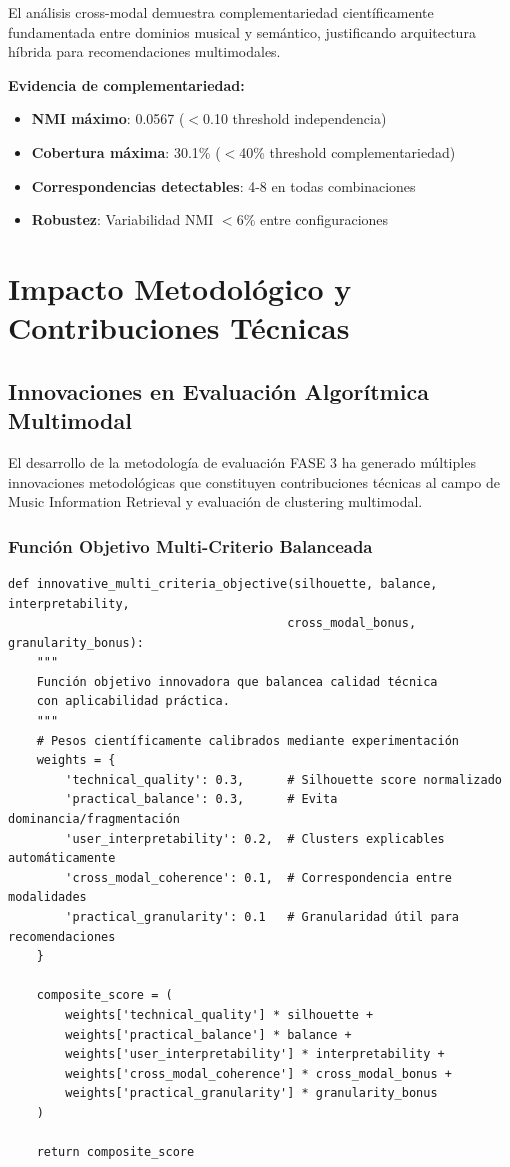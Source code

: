 \documentclass[12pt,a4paper]{report}
\begin{document}
El análisis cross-modal demuestra complementariedad científicamente fundamentada entre dominios musical y semántico, justificando arquitectura híbrida para recomendaciones multimodales.

\textbf{Evidencia de complementariedad:}
\begin{itemize}
    \item \textbf{NMI máximo}: 0.0567 ($<$0.10 threshold independencia)
    \item \textbf{Cobertura máxima}: 30.1\% ($<$40\% threshold complementariedad)
    \item \textbf{Correspondencias detectables}: 4-8 en todas combinaciones
    \item \textbf{Robustez}: Variabilidad NMI $<$6\% entre configuraciones
\end{itemize}

\section{Impacto Metodológico y Contribuciones Técnicas}

\subsection{Innovaciones en Evaluación Algorítmica Multimodal}

El desarrollo de la metodología de evaluación FASE 3 ha generado múltiples innovaciones metodológicas que constituyen contribuciones técnicas al campo de Music Information Retrieval y evaluación de clustering multimodal.

\subsubsection{Función Objetivo Multi-Criterio Balanceada}

\begin{lstlisting}[caption={Función Objetivo Innovadora Multi-Criterio}]
def innovative_multi_criteria_objective(silhouette, balance, interpretability,
                                       cross_modal_bonus, granularity_bonus):
    """
    Función objetivo innovadora que balancea calidad técnica
    con aplicabilidad práctica.
    """
    # Pesos científicamente calibrados mediante experimentación
    weights = {
        'technical_quality': 0.3,      # Silhouette score normalizado
        'practical_balance': 0.3,      # Evita dominancia/fragmentación
        'user_interpretability': 0.2,  # Clusters explicables automáticamente
        'cross_modal_coherence': 0.1,  # Correspondencia entre modalidades
        'practical_granularity': 0.1   # Granularidad útil para recomendaciones
    }

    composite_score = (
        weights['technical_quality'] * silhouette +
        weights['practical_balance'] * balance +
        weights['user_interpretability'] * interpretability +
        weights['cross_modal_coherence'] * cross_modal_bonus +
        weights['practical_granularity'] * granularity_bonus
    )

    return composite_score
\end{lstlisting}
\end{document}
